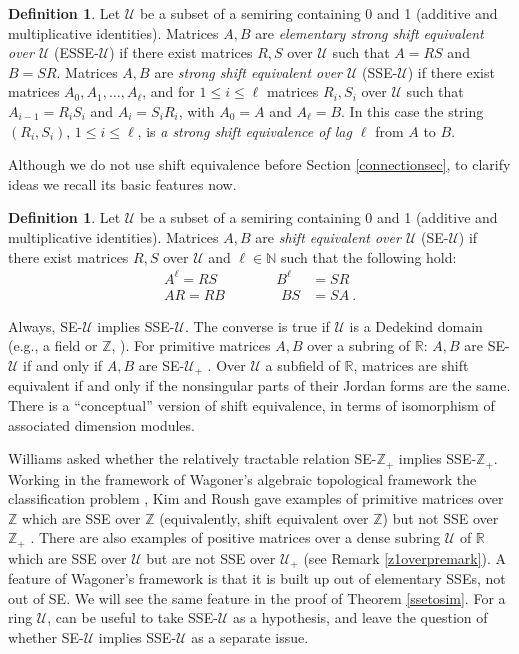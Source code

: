 \documentclass{amsart}
\theoremstyle{definition}
\newtheorem{definition}[theorem]{Definition}
\theoremstyle{remark}
\numberwithin{equation}{section}
\begin{document}
\begin{definition} \label{ssedefn}
Let $\mathcal U$ be a subset of a semiring containing 
0 and 1 (additive and multiplicative identities). 
Matrices $A,B$ are 
{\it elementary strong shift equivalent over $\mathcal U$}
(ESSE-$\mathcal U$) if there exist matrices $R,S$ over $\mathcal U$ 
such that $A=RS$ and $B=SR$. 
 Matrices $A,B$ are {\it strong shift equivalent over $\mathcal U$}  
(SSE-$\mathcal U$) if there exist matrices $A_0, A_1, \dots , A_{\ell}$, 
and for $1\leq i \leq \ell$ matrices $R_i,S_i$ over $\mathcal U$ such 
that $A_{i-1}=R_iS_i$ and $A_i=S_iR_i$, with $A_0=A$ and $A_{\ell}=B$. 
In this case the string $(R_i,S_i)$, $1\leq i \leq \ell$, is 
{\it a strong shift equivalence of lag $\ell$} from $A$ to $B$. 
\end{definition} 

Although we do not use shift equivalence before Section \ref{connectionsec}, 
to clarify ideas we recall its basic features now. 

\begin{definition} \label{sedefn} 
Let $\mathcal U$ be a subset of a semiring containing 
0 and 1 (additive and multiplicative identities). 
Matrices $A,B$ are 
{\it  shift equivalent over $\mathcal U$}
(SE-$\mathcal U$) if there exist matrices $R,S$ over $\mathcal U$ 
and $\ell \in \mathbb N$ such that the following hold: 
\begin{align*} 
A^{\ell} =RS\ \qquad \qquad B^{\ell} &=SR \\ 
AR = RB  \qquad \qquad BS &=SA \ . 
\end{align*}
\end{definition} 

Always, SE-$\mathcal U$ implies SSE-$\mathcal U$. 
The converse is true if $\mathcal U$ is a Dedekind domain \cite{BH2}
(e.g., a field or $\mathbb Z$, \cite{E,Wi2}). 
For primitive matrices $A,B$ over a subring of $\mathbb R$:  
$A,B$ are SE-$\mathcal U$ if and only if  
 $A,B$ are SE-$\mathcal U_+$ . 
Over $\mathcal U$ a subfield of $\mathbb R$, matrices are shift equivalent 
if and only if the nonsingular parts of their Jordan forms are the same. 
There is a ``conceptual'' version of shift equivalence, in terms of 
isomorphism of associated dimension modules. 

Williams asked whether the relatively tractable relation 
SE-$\mathbb Z_+$ implies 
SSE-$\mathbb Z_+$.   
Working in the framework of Wagoner's 
algebraic topological framework the classification 
problem \cite{Wa}, Kim and Roush gave examples of 
primitive matrices over $\mathbb Z$ 
which are SSE over $\mathbb Z$ (equivalently, shift 
equivalent over $\mathbb Z$) but not SSE over 
$\mathbb Z_+$ \cite{KR6}. There are also 
examples of positive matrices over a dense subring $\mathcal U$ 
of $\mathbb R$ which are SSE over $\mathcal U$ but are not 
SSE over $\mathcal U_+$ 
(see Remark \ref{z1overpremark}). A feature of Wagoner's 
framework is that it is built up out of elementary SSEs, 
not out of SE. We will see the same feature in the 
proof of Theorem \ref{ssetosim}. For a ring $\mathcal U$, 
 can be useful to 
take SSE-$\mathcal U$ as a hypothesis, and leave the 
question of whether SE-$\mathcal U$ implies 
SSE-$\mathcal U$  as a separate issue. 
\end{document}
